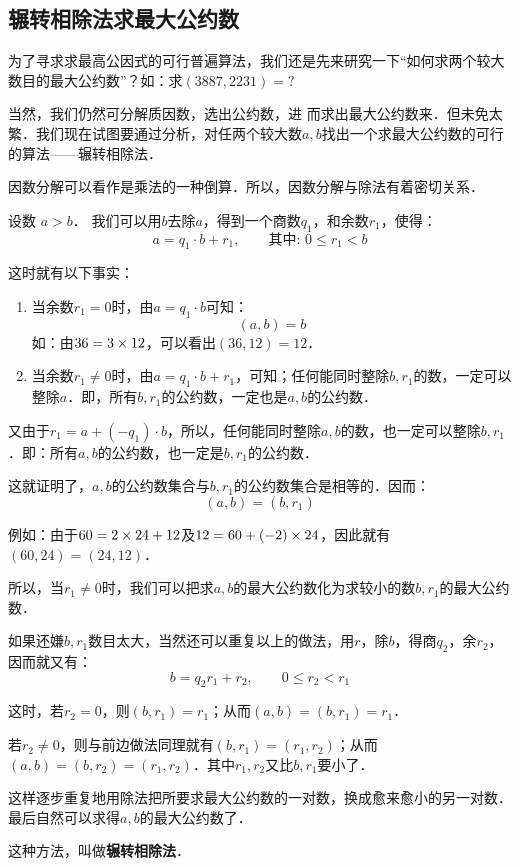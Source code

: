 \subsection{辗转相除法求最大公约数}

为了寻求求最高公因式的可行普遍算法，我们还是先来研究一下“如何求两个较大数目的最大公约数”？如：求$(3887, 2231)=?$

当然，我们仍然可分解质因数，选出公约数，进
而求出最大公约数来．但未免太繁．我们现在试图要通过分析，对任两个较大数$a,b$找出一个求最大公约数的可行的算法——辗转相除法．

\begin{analyze}
 因数分解可以看作是乘法的一种倒算．所以，因数分解与除法有着密切关系．

设数 $a>b$． 我们可以用$b$去除$a$，得到一个商数$q_1$，和余数$r_1$，使得：
$$a=q_1\cdot b+r_1,\qquad \text{其中: }0\le r_1<b$$

这时就有以下事实：
\begin{enumerate}
    \item 当余数$r_1=0$时，由$a=q_1\cdot b$可知：
    \[(a,b) =b\]
    如：由$36=3\times12$，可以看出$(36, 12)=12$．

\item 当余数$r_1\ne 0$时，由$a=q_1\cdot b+r_1$，可知；任何能同时整除$b,r_1$的数，一定可以整除$a$．即，所有$b,r_1$的公约数，一定也是$a,b$的公约数．
\end{enumerate}

又由于$r_1=a+(-q_1)\cdot b$，所以，任何能同时整除$a,b$的数，也一定可以整除$b,r_1$．即：所有$a,b$的公约数，也一定是$b,r_1$的公约数．

这就证明了，$a,b$的公约数集合与$b,r_1$的公约数集合是相等的．因而：   
\[(a,b)=(b,r_1)  \]

例如：由于$60=2\times 24+12$及$12=60+(-2)\times 24$，因此就有$(60,24)=(24,12)$．

所以，当$r_1\ne 0$时，我们可以把求$a,b$的最大公约数化为求较小的数$b,r_1$的最大公约数．

如果还嫌$b,r_1$数目太大，当然还可以重复以上的做法，用$r$，除$b$，得商$q_2$，余$r_2$，因而就又有：
\[b=q_2r_1 +r_2,\qquad  0\le r_2<r_1\]

这时，若$r_2=0$，则$(b,r_1)=r_1$；从而$(a,b)= (b,r_1) =r_1$．

若$r_2\ne 0$，则与前边做法同理就有$(b,r_1)=(r_1, r_2)$；从而$(a,b)=(b,r_2)=(r_1,r_2)$．其中$r_1,r_2$又比$b,r_1$要小了．

这样逐步重复地用除法把所要求最大公约数的一对数，换成愈来愈小的另一对数．最后自然可以求得$a,b$的最大公约数了．

这种方法，叫做\textbf{辗转相除法}．
\end{analyze}



